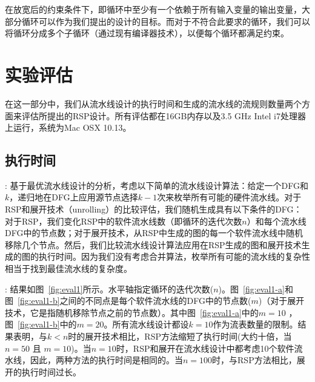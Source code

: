 \documentclass{ctexart}
\newcommand{\para}[1]{\smallskip\noindent {\bf #1}}
\begin{document}
在放宽后的约束条件下，即循环中至少有一个依赖于所有输入变量的输出变量，大部分循环可以作为我们提出的设计的目标。而对于不符合此要求的循环，我们可以将循环分成多个子循环（通过现有编译器技术），以便每个循环都满足约束。


\section{实验评估}
\label{sec:eval}

在这一部分中，我们从流水线设计的执行时间和生成的流水线的流规则数量两个方面来评估所提出的RSP设计。所有评估都在16GB内存以及3.5 GHz Intel i7处理器上运行，系统为Mac OSX 10.13。

\subsection{执行时间}
\para{实验方法}: 基于最优流水线设计的分析，考虑以下简单的流水线设计算法：给定一个DFG和$k$，递归地在DFG上应用源节点选择$k-1$次来枚举所有可能的硬件流水线。对于RSP和展开技术（unrolling）的比较评估，我们随机生成具有以下条件的DFG：对于RSP，我们变化RSP中的软件流水线数（即循环的迭代次数$n$）和每个流水线DFG中的节点数；对于展开技术，从RSP中生成的图的每一个软件流水线中随机移除几个节点。然后，我们比较流水线设计算法应用在RSP生成的图和展开技术生成的图的执行时间。因为我们没有考虑合并算法，枚举所有可能的流水线的复杂性相当于找到最佳流水线的复杂度。


\para{实验结果}: 结果如图~\ref{fig:eval1}所示。水平轴指定循环的迭代次数($n$)。图~\ref{fig:eval1-a}和图~\ref{fig:eval1-b}之间的不同点是每个软件流水线的DFG中的节点数($m$)（对于展开技术，它是指随机移除节点之前的节点数）。其中图~\ref{fig:eval1-a}中的$m = 10$ ，图~\ref{fig:eval1-b}中的$m = 20$。所有流水线设计都设$k=10$作为流表数量的限制。结果表明，与$k < n$时的展开技术相比，RSP方法缩短了执行时间(大约十倍，当$n = 50$ 且 $m = 10$)。当$n = 10$时，RSP和展开在流水线设计中都考虑10个软件流水线，因此，两种方法的执行时间是相同的。当$n = 100$时，与RSP方法相比，展开的执行时间过长。
\end{document}
